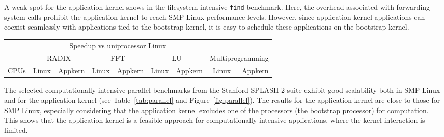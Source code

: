 A weak spot for the application kernel shows in the filesystem-intensive
\texttt{find} benchmark. Here, the overhead associated with forwarding system
calls prohibit the application kernel to reach SMP Linux performance levels.
However, since application kernel applications can coexist seamlessly with
applications tied to the bootstrap kernel, it is easy to schedule these
applications on the bootstrap kernel.

\begin{table*}
  \caption[Parallel and multiprogramming speedup]{Speedup for the parallel and multiprogramming benchmarks.}
  \begin{center}
    \label{tab:parallel}
    \begin{footnotesize}
      \begin{tabular}{r|rr|rr|rr|rr}
        \hline
        & \multicolumn{6}{c}{Speedup vs uniprocessor Linux} \\
        & \multicolumn{2}{c}{RADIX} & \multicolumn{2}{c}{FFT} & \multicolumn{2}{c}{LU} & \multicolumn{2}{c}{Multiprogramming} \\
        CPUs & Linux & Appkern  & Linux & Appkern  & Linux & Appkern & Linux & Appkern\\
        \hline
        
        \hline
      \end{tabular}
    \end{footnotesize}
  \end{center}
\end{table*}

The selected computationally intensive parallel benchmarks from the Stanford
SPLASH 2 suite exhibit good scalability both in SMP Linux and for the
application kernel (see Table~\ref{tab:parallel} and
Figure~\ref{fig:parallel}). The results for the application kernel are close
to those for SMP Linux, especially considering that the application kernel
excludes one of the processors (the bootstrap processor) for computation. This
shows that the application kernel is a feasible approach for computationally
intensive applications, where the kernel interaction is limited.

